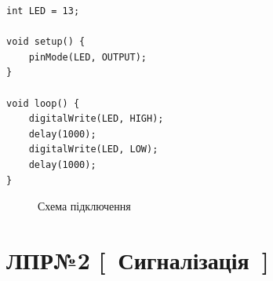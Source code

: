 \documentclass[12pt,a4paper]{report}  %
\begin{document}
\begin{lstlisting}[label=lab01ex01,caption=Програмний код]
int LED = 13;

void setup() {
	pinMode(LED, OUTPUT);
}

void loop() {
	digitalWrite(LED, HIGH);
	delay(1000);
	digitalWrite(LED, LOW);
	delay(1000);	
}
\end{lstlisting}

\begin{figure}[h!]
\caption{Схема підключення}
\label{ris:image}
\end{figure}

\section{ЛПР№2 [~Сигналізація~]}
\end{document}
